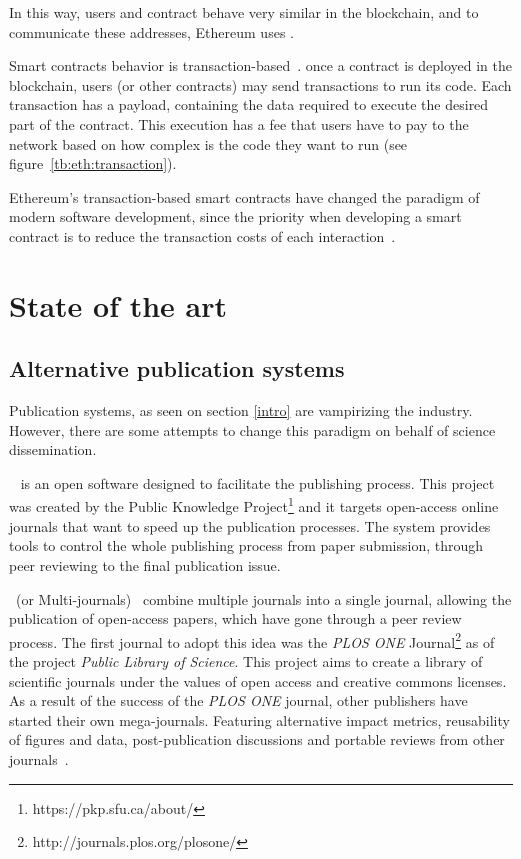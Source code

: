 In this way, users and contract behave very similar in the blockchain, and to
communicate these addresses, Ethereum uses .


Smart contracts behavior is transaction-based~\cite{wood2014ethereum}. once a
contract is deployed in the blockchain, users (or other contracts) may send
transactions to run its code. Each transaction has a payload, containing the
data required to execute the desired part of the contract. This execution has a
fee that users have to pay to the network based on how complex is the code they
want to run (see figure~\ref{tb:eth:transaction}).

Ethereum's transaction-based smart contracts have changed the paradigm of modern
software development, since the priority when developing a smart contract is to
reduce the transaction costs of each interaction~\cite{delmolino2016step}.


\section{State of the art}
\subsection{Alternative publication systems}
\label{soa:aps}
Publication systems, as seen on section \ref{intro} are vampirizing the
industry. However, there are some attempts to change this paradigm on behalf of
science dissemination.

~\cite{willinsky2005open} is an open software designed
to facilitate the publishing process. This project was created by the Public
Knowledge Project\footnote{https://pkp.sfu.ca/about/} and it targets open-access
online journals that want to speed up the publication processes. The system
provides tools to control the whole publishing process from paper submission,
through peer reviewing to the final publication issue.

~(or Multi-journals)~\cite{binfield2013open,wellen2013open}
combine multiple journals into a single journal, allowing the publication of
open-access papers, which have gone through a peer review process. The first
journal to adopt this idea was the \emph{PLOS ONE}
Journal\footnote{http://journals.plos.org/plosone/} as of the project
\emph{Public Library of Science}. This project aims to create a library of
scientific journals under the values of open access and creative commons
licenses. As a result of the success of the \emph{PLOS ONE} journal, other
publishers have started their own mega-journals. Featuring alternative impact
metrics, reusability of figures and data, post-publication discussions and
portable reviews from other journals~\cite{bjork2015have}.

